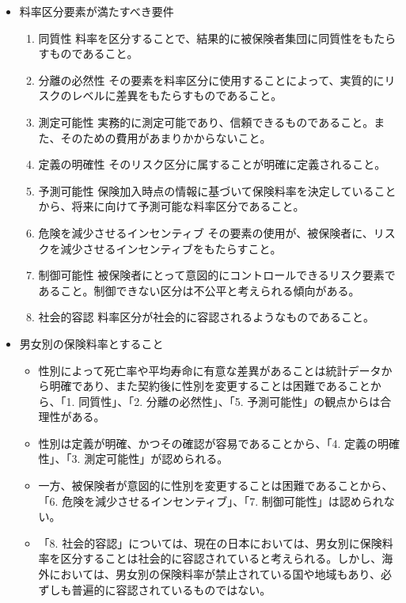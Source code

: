 \documentclass[
]{article}
\providecommand{\tightlist}{%
  \setlength{\itemsep}{0pt}\setlength{\parskip}{0pt}}
\begin{document}
\begin{itemize}
\tightlist
\item
  料率区分要素が満たすべき要件

  \begin{enumerate}
  \def\labelenumi{\arabic{enumi}.}
  \tightlist
  \item
    同質性
    料率を区分することで、結果的に被保険者集団に同質性をもたらすものであること。
  \item
    分離の必然性
    その要素を料率区分に使用することによって、実質的にリスクのレベルに差異をもたらすものであること。
  \item
    測定可能性
    実務的に測定可能であり、信頼できるものであること。また、そのための費用があまりかからないこと。
  \item
    定義の明確性 そのリスク区分に属することが明確に定義されること。
  \item
    予測可能性
    保険加入時点の情報に基づいて保険料率を決定していることから、将来に向けて予測可能な料率区分であること。
  \item
    危険を減少させるインセンティブ
    その要素の使用が、被保険者に、リスクを減少させるインセンティブをもたらすこと。
  \item
    制御可能性
    被保険者にとって意図的にコントロールできるリスク要素であること。制御できない区分は不公平と考えられる傾向がある。
  \item
    社会的容認 料率区分が社会的に容認されるようなものであること。
  \end{enumerate}
\item
  男女別の保険料率とすること

  \begin{itemize}
  \tightlist
  \item
    性別によって死亡率や平均寿命に有意な差異があることは統計データから明確であり、また契約後に性別を変更することは困難であることから、「1.
    同質性」、「2. 分離の必然性」、「5.
    予測可能性」の観点からは合理性がある。
  \item
    性別は定義が明確、かつその確認が容易であることから、「4.
    定義の明確性」、「3. 測定可能性」が認められる。
  \item
    一方、被保険者が意図的に性別を変更することは困難であることから、「6.
    危険を減少させるインセンティブ」、「7. 制御可能性」は認められない。
  \item
    「8.
    社会的容認」については、現在の日本においては、男女別に保険料率を区分することは社会的に容認されていると考えられる。しかし、海外においては、男女別の保険料率が禁止されている国や地域もあり、必ずしも普遍的に容認されているものではない。
  \end{itemize}
\end{itemize}
\end{document}
